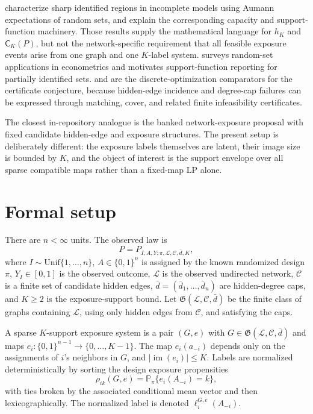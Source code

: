 \documentclass[11pt]{article}
\renewcommand{\Pr}{\mathbb{P}}
\theoremstyle{definition}
\theoremstyle{plain}
\theoremstyle{remark}
\begin{document}
\cite{BeresteanuMolchanovMolinari2011} characterize sharp identified regions in incomplete models using Aumann expectations of random sets, and \cite{BeresteanuMolchanovMolinari2012} explain the corresponding capacity and support-function machinery.  Those results supply the mathematical language for \(h_K\) and \(\mathsf C_K(P)\), but not the network-specific requirement that all feasible exposure events arise from one graph and one \(K\)-label system.  \cite{MolchanovMolinari2014} surveys random-set applications in econometrics and motivates support-function reporting for partially identified sets.  \cite{EdmondsMatchingPolytope1965} and \cite{Wolsey1975} are the discrete-optimization comparators for the certificate conjecture, because hidden-edge incidence and degree-cap failures can be expressed through matching, cover, and related finite infeasibility certificates.

The closest in-repository analogue is the banked network-exposure proposal with fixed candidate hidden-edge and exposure structures.  The present setup is deliberately different: the exposure labels themselves are latent, their image size is bounded by \(K\), and the object of interest is the support envelope over all sparse compatible maps rather than a fixed-map LP alone.

\section{Formal setup}
\label{sec:formal-setup}
There are \(n<\infty\) units.  The observed law is
\[
P=P_{I,A,Y;\pi,\mathcal L,\mathcal C,\bar d,K},
\]
where \(I\sim\mathrm{Unif}\{1,\ldots,n\}\), \(A\in\{0,1\}^n\) is assigned by the known randomized design \(\pi\), \(Y_I\in[0,1]\) is the observed outcome, \(\mathcal L\) is the observed undirected network, \(\mathcal C\) is a finite set of candidate hidden edges, \(\bar d=(\bar d_1,\ldots,\bar d_n)\) are hidden-degree caps, and \(K\ge2\) is the exposure-support bound.  Let \(\mathfrak G(\mathcal L,\mathcal C,\bar d)\) be the finite class of graphs containing \(\mathcal L\), using only hidden edges from \(\mathcal C\), and satisfying the caps.

A sparse \(K\)-support exposure system is a pair \((G,e)\) with \(G\in\mathfrak G(\mathcal L,\mathcal C,\bar d)\) and maps \(e_i:\{0,1\}^{n-1}\to\{0,\ldots,K-1\}\).  The map \(e_i(a_{-i})\) depends only on the assignments of \(i\)'s neighbors in \(G\), and \(|\operatorname{im}(e_i)|\le K\).  Labels are normalized deterministically by sorting the design exposure propensities
\[
\rho_{ik}(G,e)=\Pr_\pi\{e_i(A_{-i})=k\},
\]
with ties broken by the associated conditional mean vector and then lexicographically.  The normalized label is denoted \(\ell_i^{G,e}(A_{-i})\).
\end{document}
